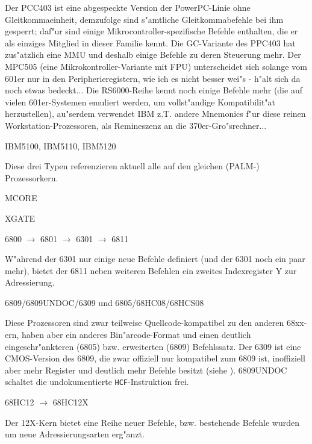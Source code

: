 \documentclass[12pt,a4paper,twoside]{report}
\begin{document}
Der PCC403 ist eine abgespeckte Version der PowerPC-Linie ohne
Gleitkommaeinheit, demzufolge sind s"amtliche Gleitkommabefehle
bei ihm gesperrt; daf"ur sind einige Mikrocontroller-spezifische
Befehle enthalten, die er als einziges Mitglied in dieser Familie
kennt.  Die GC-Variante des PPC403 hat zus"atzlich eine MMU und deshalb
einige Befehle zu deren Steuerung mehr.  Der MPC505 (eine Mikrokontroller-Variante mit FPU)
unterscheidet sich solange vom 601er nur in den Peripherieregistern,
wie ich es nicht besser wei"s - \cite{Mot505} h"alt sich da noch etwas bedeckt...
Die RS6000-Reihe kennt noch einige Befehle mehr (die auf vielen
601er-Systemen emuliert werden, um vollst"andige Kompatibilit"at
herzustellen), au"serdem verwendet IBM z.T. andere Mnemonics f"ur
diese reinen Workstation-Prozessoren, als Remineszenz an die
370er-Gro"srechner...
\begin{cpulist}
   IBM5100, IBM5110, IBM5120
\end{cpulist}
Diese drei Typen referenzieren aktuell alle auf den gleichen (PALM-)
Prozessorkern.
\begin{cpulist}
   MCORE
\end{cpulist}
\begin{cpulist}
   XGATE
\end{cpulist}
\begin{cpulist}
   6800 $\rightarrow$ 6801 $\rightarrow$ 6301 $\rightarrow$ 6811
\end{cpulist}
W"ahrend der 6301 nur einige neue Befehle definiert (und der 6301
noch ein paar mehr), bietet der 6811 neben weiteren Befehlen ein
zweites Indexregister Y zur Adressierung.
\begin{cpulist}
   6809/6809UNDOC/6309 und 6805/68HC08/68HCS08
\end{cpulist}
Diese Prozessoren sind zwar teilweise Quellcode-kompatibel zu den
anderen 68xx-ern, haben aber ein anderes Bin"arcode-Format und einen
deutlich eingeschr"ankteren (6805) bzw. erweiterten (6809) Befehlssatz.
Der 6309 ist eine CMOS-Version des 6809, die zwar offiziell
nur kompatibel zum 6809 ist, inoffiziell aber mehr Register und
deutlich mehr Befehle besitzt (siehe \cite{Kaku}).  6809UNDOC schaltet
die undokumentierte {\tt HCF}-Instruktion frei.
\begin{cpulist}
   68HC12 $\longrightarrow$ 68HC12X
\end{cpulist}
Der 12X-Kern bietet eine Reihe neuer Befehle, bzw. bestehende Befehle
wurden um neue Adressierungsarten erg"anzt.
\end{document}
